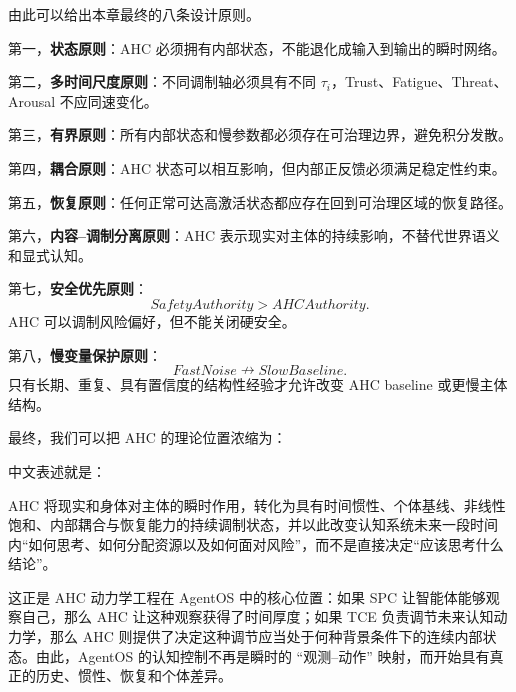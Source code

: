 由此可以给出本章最终的八条设计原则。

第一，\textbf{状态原则}：AHC 必须拥有内部状态，不能退化成输入到输出的瞬时网络。

第二，\textbf{多时间尺度原则}：不同调制轴必须具有不同 $\tau_i$，Trust、Fatigue、Threat、Arousal 不应同速变化。

第三，\textbf{有界原则}：所有内部状态和慢参数都必须存在可治理边界，避免积分发散。

第四，\textbf{耦合原则}：AHC 状态可以相互影响，但内部正反馈必须满足稳定性约束。

第五，\textbf{恢复原则}：任何正常可达高激活状态都应存在回到可治理区域的恢复路径。

第六，\textbf{内容--调制分离原则}：AHC 表示现实对主体的持续影响，不替代世界语义和显式认知。

第七，\textbf{安全优先原则}：
\[
SafetyAuthority>AHCAuthority.
\]
AHC 可以调制风险偏好，但不能关闭硬安全。

第八，\textbf{慢变量保护原则}：
\[
FastNoise\nrightarrow SlowBaseline.
\]
只有长期、重复、具有置信度的结构性经验才允许改变 AHC baseline 或更慢主体结构。

最终，我们可以把 AHC 的理论位置浓缩为：
\begin{statementbox}
\centering
{}
\end{statementbox}

中文表述就是：

\begin{statementbox}
AHC 将现实和身体对主体的瞬时作用，转化为具有时间惯性、个体基线、非线性饱和、内部耦合与恢复能力的持续调制状态，并以此改变认知系统未来一段时间内“如何思考、如何分配资源以及如何面对风险”，而不是直接决定“应该思考什么结论”。
\end{statementbox}

这正是 AHC 动力学工程在 AgentOS 中的核心位置：如果 SPC 让智能体能够观察自己，那么 AHC 让这种观察获得了时间厚度；如果 TCE 负责调节未来认知动力学，那么 AHC 则提供了决定这种调节应当处于何种背景条件下的连续内部状态。由此，AgentOS 的认知控制不再是瞬时的 ``观测--动作'' 映射，而开始具有真正的历史、惯性、恢复和个体差异。

